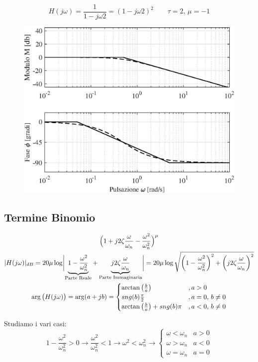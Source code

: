 \begin{nexample}
	\[ H(j\omega) = \frac{1}{1-j\omega2} = (1-j\omega2)^2 \qquad\tau = 2, \, \mu = -1 \]
\begin{figure}[H]
	\centering
	\includegraphics[width=0.7\linewidth]{immagini/cap6_Bode/es4}
	\label{fig:Bode_es4}
\end{figure}	
\end{nexample}

\subsection{Termine Binomio}
\begin{gather*}
	\Big(1+j2\zeta\frac{\omega}{\omega_{n}}-\frac{\omega^2}{\omega^{2}_{n}} \Big)^{\mu}\\
	\abs{H(j\omega)}_{dB} = 20 \mu \log \Abs{\underbrace{1-\frac{\omega^2}{\omega^{2}_{n}}}_{\text{\scriptsize Parte Reale}}+\underbrace{j2\zeta\frac{\omega}{\omega_{n}}}_{\text{\scriptsize Parte Immaginaria}}} = 20\mu \log \sqrt{\bigg(1-\frac{\omega^2}{\omega^{2}_{n}} \bigg)^2+\bigg(j2\zeta\frac{\omega}{\omega_{n}}\bigg)^2}\\
	\arg\big(H(j\omega)\big) = \arg(a+jb) = 
	\begin{cases}
		\arctan\big(\frac{b}{a}\big) & ,a>0\\
		\sng(b)\frac{\pi}{2} & ,a=0,\, b \ne 0\\
		\arctan\big(\frac{b}{a}\big) + \sng(b)\pi & ,a<0,\, b \ne 0 
	\end{cases} 
\end{gather*}

Studiamo i vari casi:
\[ 
	1-\frac{\omega^2}{\omega^{2}_{n}}>0 \rightarrow \frac{\omega^2}{\omega^{2}_{n}} <1 \rightarrow \omega^2 < \omega^2_n \rightarrow 
	\begin{cases}
		\omega < \omega_n &a>0\\
		\omega > \omega_n &a<0\\
		\omega = \omega_n &a=0
	\end{cases}
\]

